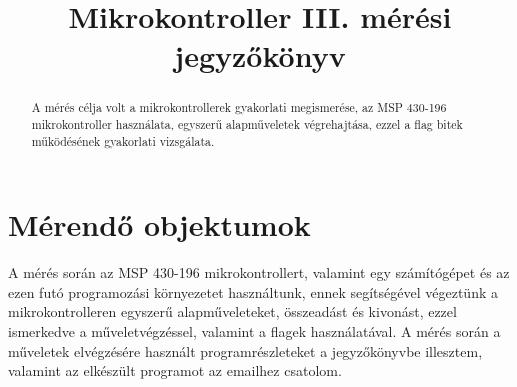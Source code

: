 \documentclass[10pt, conference, a4paper]{ITKproc}
\begin{document}
\title{Mikrokontroller III. mérési jegyzőkönyv}
\author{
}


\maketitle

\begin{abstract}
A mérés célja volt a mikrokontrollerek gyakorlati megismerése, az MSP 430-196 mikrokontroller használata, egyszerű alapműveletek végrehajtása, ezzel a flag bitek működésének gyakorlati vizsgálata. 
\end{abstract}

\IEEEpeerreviewmaketitle
\section{Mérendő objektumok}

A mérés során az MSP 430-196 mikrokontrollert, valamint egy számítógépet és az ezen futó programozási környezetet használtunk, ennek segítségével végeztünk a mikrokontrolleren egyszerű alapműveleteket, összeadást és kivonást, ezzel ismerkedve a műveletvégzéssel, valamint a flagek használatával. A mérés során a műveletek elvégzésére használt programrészleteket a jegyzőkönyvbe illesztem, valamint az elkészült programot az emailhez csatolom. 
\end{document}
